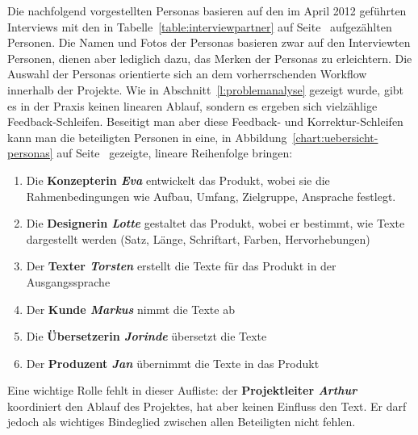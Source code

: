 Die nachfolgend vorgestellten Personas basieren auf den im April 2012 geführten Interviews mit den in Tabelle~\ref{table:interviewpartner} auf Seite~\pageref{table:interviewpartner} aufgezählten Personen. Die Namen und Fotos der Personas basieren zwar auf den Interviewten Personen, dienen aber lediglich dazu, das Merken der Personas zu erleichtern. Die Auswahl der Personas orientierte sich an dem vorherrschenden Workflow innerhalb der Projekte. Wie in Abschnitt~\ref{l:problemanalyse} gezeigt wurde, gibt es in der Praxis keinen linearen Ablauf, sondern es ergeben sich vielzählige Feedback-Schleifen. Beseitigt man aber diese Feedback- und Korrektur-Schleifen kann man die beteiligten Personen in eine, in Abbildung~\ref{chart:uebersicht-personas} auf Seite~\pageref{chart:uebersicht-personas} gezeigte, lineare Reihenfolge bringen:
\begin{enumerate}\itemsep -5pt
\item Die \textbf{Konzepterin \emph{Eva}} entwickelt das Produkt, wobei sie die Rahmenbedingungen wie Aufbau, Umfang, Zielgruppe, Ansprache festlegt. 
\item Die \textbf{Designerin \emph{Lotte}} gestaltet das Produkt, wobei er bestimmt, wie Texte dargestellt werden (Satz, Länge, Schriftart, Farben, Hervorhebungen)
\item Der \textbf{Texter \emph{Torsten}} erstellt die Texte für das Produkt in der Ausgangssprache
\item Der \textbf{Kunde \emph{Markus}} nimmt die Texte ab
\item Die \textbf{Übersetzerin \emph{Jorinde}} übersetzt die Texte
\item Der \textbf{Produzent \emph{Jan}} übernimmt die Texte in das Produkt
\end{enumerate}

Eine wichtige Rolle fehlt in dieser Aufliste: der \textbf{Projektleiter \emph{Arthur}} koordiniert den Ablauf des Projektes, hat aber keinen Einfluss den Text. Er darf jedoch als wichtiges Bindeglied zwischen allen Beteiligten  nicht fehlen.

